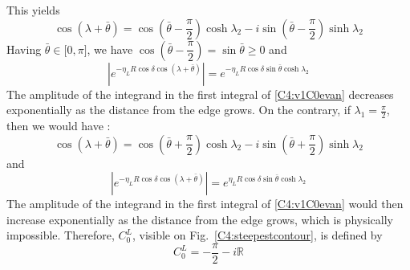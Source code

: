 This yields
\begin{equation}
\cos(\lambda+\bar{\theta})=\cos(\bar{\theta}-\dfrac{\pi}{2})\cosh\lambda_2-i\sin(\bar{\theta}-\dfrac{\pi}{2})\sinh\lambda_2
\end{equation}
Having $\bar{\theta} \in \lbrack 0,\pi \rbrack$, we have $\cos(\bar{\theta}-\dfrac{\pi}{2})=\sin\bar{\theta}\geq 0$ and 
\begin{equation}
|e^{-\eta_L R\cos\delta\cos(\lambda+\bar{\theta})}|=e^{-\eta_L R\cos\delta\sin\bar{\theta}\cosh\lambda_2}
\end{equation}
The amplitude of the integrand in the first integral of \eqref{C4:v1C0evan} decreases exponentially as the distance from the edge grows. On the contrary, if $\lambda_1=\frac{\pi}{2}$, then we would have :
\begin{equation}
\cos(\lambda+\bar{\theta})=\cos(\bar{\theta}+\dfrac{\pi}{2})\cosh\lambda_2-i\sin(\bar{\theta}+\dfrac{\pi}{2})\sinh\lambda_2
\end{equation}
and
\begin{equation}
|e^{-\eta_L R\cos\delta\cos(\lambda+\bar{\theta})}|=e^{\eta_L R\cos\delta\sin\bar{\theta}\cosh\lambda_2}
\end{equation}
The amplitude of the integrand in the first integral of \eqref{C4:v1C0evan} would then increase exponentially as the distance from the edge grows, which is physically impossible. Therefore, $C_0^L$, visible on Fig.~\ref{C4:steepestcontour}, is defined by
\begin{equation}
C_0^L= -\dfrac{\pi}{2}-i\mathbb{R}
\end{equation}

